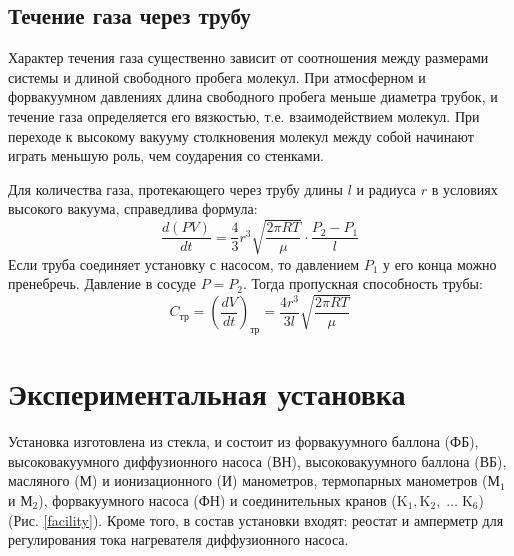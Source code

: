 \documentclass[12pt]{article}
\begin{document}
    \subsection{Течение газа через трубу}

	Характер течения газа существенно зависит от соотношения между размерами
	системы и длиной свободного пробега молекул. При атмосферном и форвакуумном
	давлениях  длина свободного пробега меньше диаметра трубок, и течение газа
	определяется его вязкостью, т.е. взаимодействием молекул. При переходе к
	высокому вакууму столкновения молекул между собой начинают играть меньшую
	роль, чем соударения со стенками.

	Для количества газа, протекающего через трубу длины $l$ и радиуса $r$ в
	условиях высокого вакуума, справедлива формула: \begin{equation}
	\frac{d(PV)}{dt} = \frac{4}{3}r^3\sqrt{\frac{2\pi RT}{\mu}}\cdot\frac{P_2 -
	P_1}{l} \label{kap} \end{equation} Если труба соединяет установку с 
    насосом, то
	давлением $P_1$ у его конца можно пренебречь. Давление в сосуде $P = P_2$.
	Тогда пропускная способность трубы: \begin{equation} C_\text{тр} =
	\left(\frac{dV}{dt}\right)_\text{тр} = \frac{4r^3}{3l}\sqrt{\frac{2\pi
	RT}{\mu}} \label{ty} \end{equation}
	
    \section{Экспериментальная установка}
    
    Установка изготовлена из стекла,
	и состоит из форвакуумного баллона (ФБ), высоковакуумного диффузионного
	насоса (ВН), высоковакуумного баллона (ВБ), масляного (М) и ионизационного
	(И) манометров, термопарных манометров ($\text{М}_1$ и $\text{М}_2$),
	форвакуумного насоса (ФН) и соединительных кранов ($\text{K}_1,
	\text{K}_2,\; \ldots \;\text{K}_6$) (Рис. \ref{facility}). Кроме того, в
	состав установки входят: реостат и амперметр для регулирования тока
	нагревателя диффузионного насоса.
        
\end{document}
